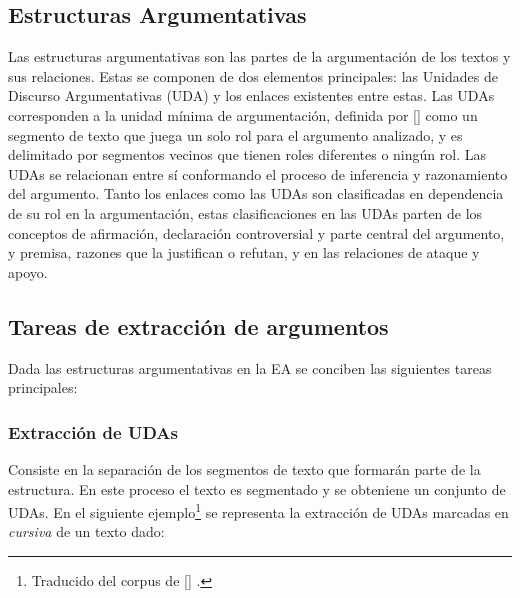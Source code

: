 \subsection{Estructuras Argumentativas}

Las estructuras argumentativas son las partes de la argumentación de los textos y sus relaciones.
Estas se componen de dos elementos principales: las Unidades de Discurso Argumentativas (UDA) y los enlaces
existentes entre estas. Las UDAs corresponden a la unidad mínima de argumentación, definida por 
[\cite{stede2018argumentation}]
como un segmento de texto que juega un solo rol para el argumento analizado, y es 
delimitado por segmentos vecinos que tienen roles diferentes o ningún rol.
Las UDAs se relacionan entre sí conformando el proceso de inferencia y razonamiento del argumento.
Tanto los enlaces como las UDAs son clasificadas en dependencia de su rol en la argumentación, estas clasificaciones 
en las UDAs parten de los conceptos de afirmación, declaración controversial y parte central del argumento, y premisa,
razones que la justifican o refutan, y en las relaciones de ataque y apoyo. 


\subsection{Tareas de extracción de argumentos}

Dada las estructuras argumentativas en la EA se conciben las siguientes tareas principales:

\subsubsection{Extracción de UDAs}

Consiste en la separación de los segmentos de texto que formarán parte de la estructura.
En este proceso el texto es segmentado y se obteniene un conjunto de UDAs. En el siguiente 
ejemplo\footnote{Traducido del corpus de 
[\cite{stab2017parsing}]
.} se representa 
la extracción de UDAs marcadas en \emph{cursiva} de un texto dado:

